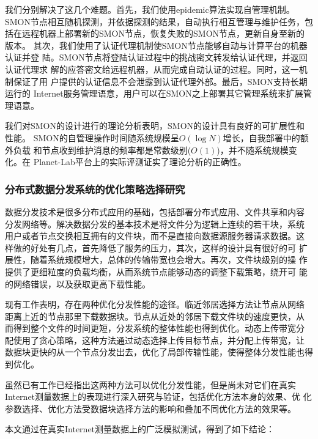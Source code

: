 我们分别解决了这几个难题。首先，我们使用epidemic算法实现自管理机制。
SMON节点相互随机探测，并依据探测的结果，自动执行相互管理与维护任务，包
括在远程机器上部署新的SMON节点，恢复失败的SMON节点，更新自身至新的版本。
其次，我们使用了认证代理机制使SMON节点能够自动与计算平台的机器认证并登
陆。SMON节点将登陆认证过程中的挑战密文转发给认证代理，并返回认证代理求
解的应答密文给远程机器，从而完成自动认证的过程。同时，这一机制保证了用
户提供的认证信息不会泄露到认证代理外部。最后，SMON支持长期运行的
Internet服务管理语意，用户可以在SMON之上部署其它管理系统来扩展管理语意。

我们对SMON的设计进行的理论分析表明，SMON的设计具有良好的可扩展性和性能。
SMON的自管理操作时间随系统规模呈$O(\log N)$增长，自我部署中的额外负载
和节点收到维护消息的频率都是常数级别($O(1)$)，并不随系统规模变化。在
Planet-Lab平台上的实际评测证实了理论分析的正确性。

\subsubsection*{分布式数据分发系统的优化策略选择研究}

数据分发技术是很多分布式应用的基础，包括部署分布式应用、文件共享和内容
分发网络等。解决数据分发的基本技术是将文件分为逻辑上连续的若干块，系统
用户或者节点交换相互拥有的文件块，而不是直接向数据源服务器请求数据。这
样做的好处有几点，首先降低了服务的压力，其次，这样的设计具有很好的可
扩展性，随着系统规模增大，总体的传输带宽也会增大。再次，文件块级别的操
作提供了更细粒度的负载均衡，从而系统节点能够动态的调整下载策略，绕开可
能的网络错误，以及获取更高下载性能。

现有工作表明，存在两种优化分发性能的途径。临近邻居选择方法让节点从网络
距离上近的节点那里下载数据块。节点从近处的邻居下载文件块的速度更快，从
而得到整个文件的时间更短，分发系统的整体性能也得到优化。动态上传带宽分
配使用了贪心策略，这种方法通过动态选择上传目标节点，并分配上传带宽，让
数据块更快的从一个节点分发出去，优化了局部传输性能，使得整体分发性能也得
到优化。

虽然已有工作已经指出这两种方法可以优化分发性能，但是尚未对它们在真实
Internet测量数据上的表现进行深入研究与验证，包括优化方法本身的效果、优
化参数选择、优化方法受数据块选择方法的影响和叠加不同优化方法的效果等。


本文通过在真实Internet测量数据上的广泛模拟测试，得到了如下结论：

